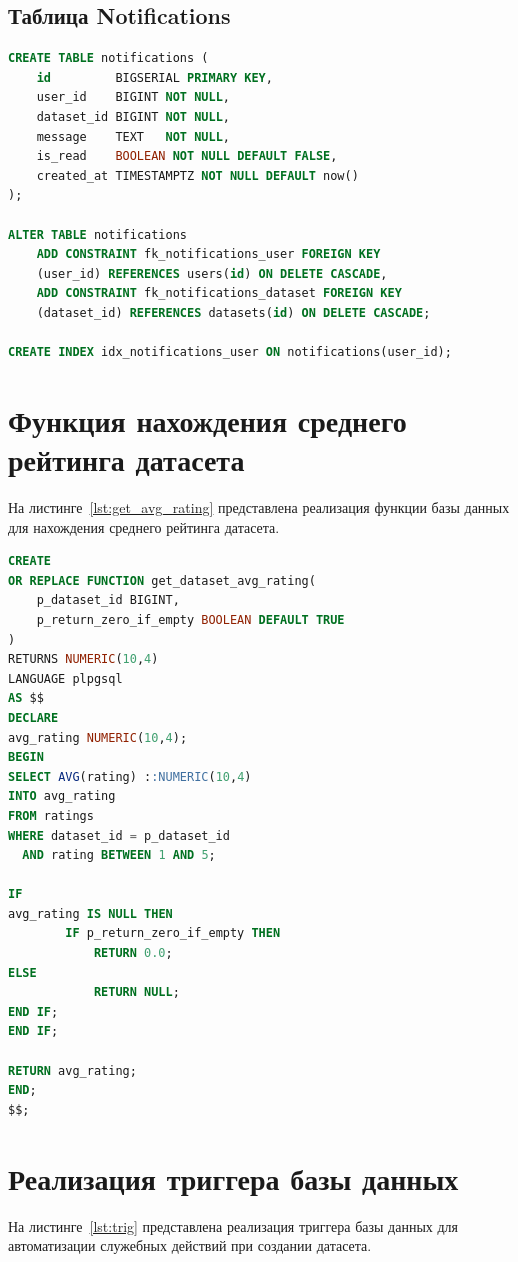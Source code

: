 \subsection*{Таблица Notifications}

\begin{lstlisting}[language=SQL,caption={Создание таблицы Notifications}]
CREATE TABLE notifications (
    id         BIGSERIAL PRIMARY KEY,
    user_id    BIGINT NOT NULL,
    dataset_id BIGINT NOT NULL,
    message    TEXT   NOT NULL,
    is_read    BOOLEAN NOT NULL DEFAULT FALSE,
    created_at TIMESTAMPTZ NOT NULL DEFAULT now()
);

ALTER TABLE notifications
    ADD CONSTRAINT fk_notifications_user FOREIGN KEY
    (user_id) REFERENCES users(id) ON DELETE CASCADE,
    ADD CONSTRAINT fk_notifications_dataset FOREIGN KEY
    (dataset_id) REFERENCES datasets(id) ON DELETE CASCADE;

CREATE INDEX idx_notifications_user ON notifications(user_id);
\end{lstlisting}

\section{Функция нахождения среднего рейтинга датасета}

На листинге~\ref{lst:get_avg_rating} представлена реализация функции базы данных для нахождения среднего рейтинга датасета.

\begin{lstlisting}[language=SQL,caption={Реализация функции базы данных}, label={lst:get_avg_rating}]
CREATE
OR REPLACE FUNCTION get_dataset_avg_rating(
    p_dataset_id BIGINT,
    p_return_zero_if_empty BOOLEAN DEFAULT TRUE
)
RETURNS NUMERIC(10,4)
LANGUAGE plpgsql
AS $$
DECLARE
avg_rating NUMERIC(10,4);
BEGIN
SELECT AVG(rating) ::NUMERIC(10,4)
INTO avg_rating
FROM ratings
WHERE dataset_id = p_dataset_id
  AND rating BETWEEN 1 AND 5;

IF
avg_rating IS NULL THEN
        IF p_return_zero_if_empty THEN
            RETURN 0.0;
ELSE
            RETURN NULL;
END IF;
END IF;

RETURN avg_rating;
END;
$$;
\end{lstlisting}

\section{Реализация триггера базы данных}

На листинге~\ref{lst:trig} представлена реализация триггера базы данных для автоматизации служебных действий
при создании датасета.


